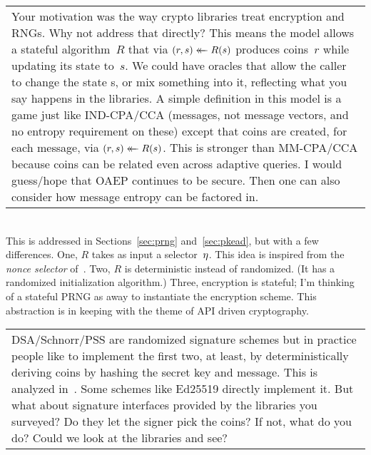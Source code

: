 
%
\newenvironment{displayquote}
{ \indent
  \footnotesize\color{gray}
  \begin{tabular}{|@{\hspace{4pt}}p{10cm}}
}
{
  \end{tabular}\\[6pt]
}

\begin{displayquote}
  Your motivation was the way crypto libraries treat encryption and RNGs. Why not
  address that directly? This means the model allows a stateful algorithm~$R$
  that via $(r,s) \mathrel{\leftarrow\mkern-14mu\leftarrow} R(s)$ produces coins~$r$ while updating its state
  to~$s$. We could have oracles that allow the caller to change the state s, or
  mix something into it, reflecting what you say happens in the libraries. A
  simple definition in this model is a game just like IND-CPA/CCA (messages, not
  message vectors, and no entropy requirement on these) except that coins are
  created, for each message, via $(r,s) \mathrel{\leftarrow\mkern-14mu\leftarrow} R(s)$. This is stronger than
  MM-CPA/CCA because coins can be related even across adaptive queries. I would
  guess/hope that OAEP continues to be secure. Then one can also consider how
  message entropy can be factored in.
\end{displayquote}
%
\cpnote{}
This is addressed in Sections~\ref{sec:prng} and~\ref{sec:pkead}, but with a few
differences.
%
One, $R$ takes as input a selector~$\eta$. This idea is inspired from the
\emph{nonce selector} of~\cite{bellare2016nonce}.
%
Two, $R$ is deterministic instead of randomized. (It has a randomized
initialization algorithm.)
%
Three, encryption is stateful; I'm thinking of a stateful PRNG as away to
instantiate the encryption scheme. This abstraction is in keeping with the theme
of API driven cryptography.

\begin{displayquote}
  DSA/Schnorr/PSS are randomized signature schemes but in practice people like
  to implement the first two, at least, by deterministically deriving coins by
  hashing the secret key and message. This is analyzed
  in~\cite{bellare2016nonce}. Some schemes like Ed25519 directly implement it.
  But what about signature interfaces provided by the libraries you surveyed? Do
  they let the signer pick the coins?  If not, what do you do? Could we look at
  the libraries and see?
\end{displayquote}
%

